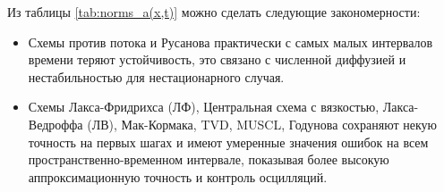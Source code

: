 \documentclass[a4paper,14pt]{extreport}
\begin{document}
\begin{table}[H]
	\ContinuedFloat %
	\centering
	\caption{Нормы ошибок для всех схем при $a(x,t)=x-t$ (продолжение)}
	\small
\end{table}
Из таблицы \ref{tab:norms_a(x,t)} можно сделать следующие закономерности:
\begin{itemize}
	\item Схемы против потока и Русанова практически с самых малых интервалов времени теряют устойчивость, это связано с численной диффузией и нестабильностью для нестационарного случая.
	\item Схемы Лакса-Фридрихса (ЛФ), Центральная схема с вязкостью, Лакса-Ведроффа (ЛВ), Мак-Кормака, TVD, MUSCL, Годунова сохраняют некую точность на первых шагах и имеют умеренные значения ошибок на всем пространственно-временном интервале, показывая более высокую аппроксимационную точность и контроль осцилляций.
\end{itemize}
\end{document}
